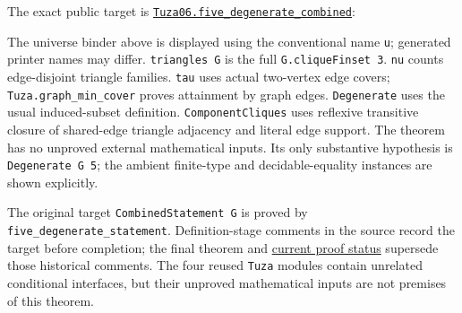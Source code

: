 \documentclass[11pt]{article}
\newenvironment{Shaded}{}{}
\begin{document}
The exact public target is
\href{https://github.com/pappa211/ai-math-experiments/blob/main/problems/TUZA-06/lean/Tuza06/FiveDegenerate.lean}{\texttt{Tuza06.five\_degenerate\_combined}}:

\begin{Shaded}
\begin{Highlighting}[]
\end{Highlighting}
\end{Shaded}

The universe binder above is displayed using the conventional name
\texttt{u}; generated printer names may differ. \texttt{triangles\ G} is
the full \texttt{G.cliqueFinset\ 3}. \texttt{nu} counts edge-disjoint
triangle families. \texttt{tau} uses actual two-vertex edge covers;
\texttt{Tuza.graph\_min\_cover} proves attainment by graph edges.
\texttt{Degenerate} uses the usual induced-subset definition.
\texttt{ComponentCliques} uses reflexive transitive closure of
shared-edge triangle adjacency and literal edge support. The theorem has
no unproved external mathematical inputs. Its only substantive
hypothesis is \texttt{Degenerate\ G\ 5}; the ambient finite-type and
decidable-equality instances are shown explicitly.

The original target \texttt{CombinedStatement\ G} is proved by
\texttt{five\_degenerate\_statement}. Definition-stage comments in the
source record the target before completion; the final theorem and
\href{https://github.com/pappa211/ai-math-experiments/blob/main/problems/TUZA-06/PROOF_STATUS.md}{current proof status}
supersede those historical comments. The four reused \texttt{Tuza}
modules contain unrelated conditional interfaces, but their unproved
mathematical inputs are not premises of this theorem.
\end{document}
